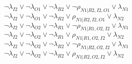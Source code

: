 $\neg\lambda_{I2} \vee \neg\lambda_{O1} \vee \neg\lambda_{R2} \vee \neg\rho_{N1|R2,I2,O1} \vee \lambda_{N1}$\\
$\neg\lambda_{I2} \vee \neg\lambda_{O1} \vee \neg\lambda_{R2} \vee \rho_{N1|R2,I2,O1} \vee \lambda_{N2}$\\
$\neg\lambda_{I2} \vee \neg\lambda_{O2} \vee \neg\lambda_{R1} \vee \neg\rho_{N1|R1,O2,I2} \vee \lambda_{N1}$\\
$\neg\lambda_{I2} \vee \neg\lambda_{O2} \vee \neg\lambda_{R1} \vee \rho_{N1|R1,O2,I2} \vee \lambda_{N2}$\\
$\neg\lambda_{I2} \vee \neg\lambda_{O2} \vee \neg\lambda_{R2} \vee \neg\rho_{N1|R2,O2,I2} \vee \lambda_{N1}$\\
$\neg\lambda_{I2} \vee \neg\lambda_{O2} \vee \neg\lambda_{R2} \vee \rho_{N1|R2,O2,I2} \vee \lambda_{N2}$\\
